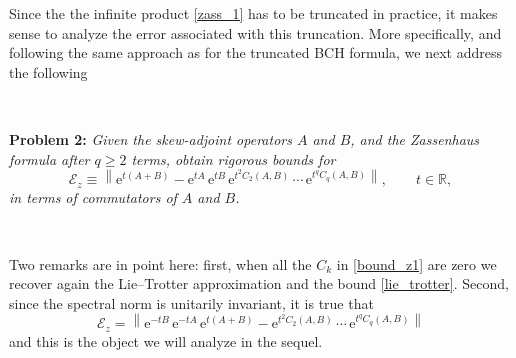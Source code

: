 \documentclass[11pt]{article}
\newcommand{\e}{\ensuremath{\mathrm{e}}}
\begin{document}
Since the the infinite product \eqref{zass_1} has to be truncated in practice,  it makes sense to analyze the error associated with
this truncation. More specifically, and following the same approach as for the truncated BCH formula, we next address the following

\

\noindent
\textbf{Problem 2:} \textit{Given the skew-adjoint operators $A$ and $B$, and the Zassenhaus formula after $q \ge 2$ terms, obtain rigorous bounds for 
\begin{equation} \label{bound_z1}
   \mathcal{E}_z \equiv \left\| \e^{t (A+B)} - \e^{t A} \, \e^{t B} \, \e^{t^2 C_2(A,B)} \, \cdots \, \e^{t^q C_q(A,B)} \right\|, \qquad t \in \mathbb{R},
\end{equation}
 in terms of commutators of $A$ and $B$.}
 
 \

Two remarks are in point here: first, when all the $C_k$ in \eqref{bound_z1} are zero we recover again the Lie--Trotter approximation and the bound
\eqref{lie_trotter}. Second, since the spectral norm is unitarily invariant,  it is true that 
\begin{equation} \label{bound_z2}
   \mathcal{E}_z  = \left\| \e^{-t B} \, \e^{-t A} \, \e^{t (A+B)} -  \e^{t^2 C_2(A,B)} \, \cdots \, \e^{t^q C_q(A,B)} \right\|
\end{equation} 
and this is the object we will analyze in the sequel. 
\end{document}
